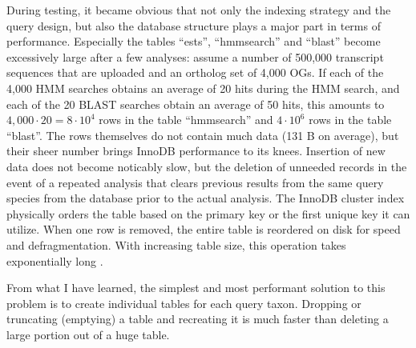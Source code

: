 During testing, it became obvious that not only the indexing strategy and the
query design, but also the database structure plays a major part in terms of
performance. Especially the tables ``ests'', ``hmmsearch'' and ``blast'' become
excessively large after a few analyses: assume a number of 500,000 transcript
sequences that are uploaded and an ortholog set of 4,000 OGs. If each of the
4,000 HMM searches obtains an average of 20 hits during the HMM search, and each
of the 20 BLAST searches obtain an average of 50 hits, this amounts to $4,000
\cdot 20 = 8 \cdot 10^4$ rows in the table ``hmmsearch'' and $4 \cdot 10^6$ rows in the
table ``blast''. The rows themselves do not contain much data (131 B
on average), but their sheer number brings InnoDB performance to its knees.
Insertion of new data does not become noticably slow, but the deletion of
unneeded records in the event of a repeated analysis that clears previous
results from the same query species from the database prior to the actual
analysis. The InnoDB cluster index physically orders the table based on the
primary key or the first unique key it can utilize. When one row is removed, the
entire table is reordered on disk for speed and defragmentation. With increasing
table size, this operation takes exponentially long .

From what I have learned, the simplest and most performant solution to this
problem is to create individual tables for each query taxon. Dropping or
truncating (emptying) a table and recreating it is much faster than deleting a
large portion out of a huge table. 
